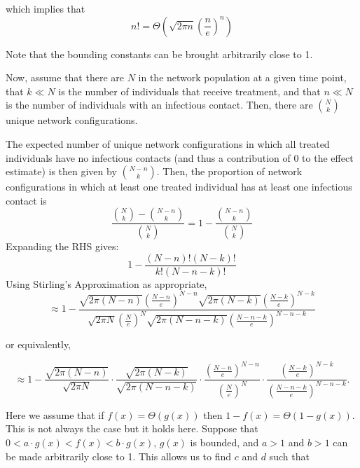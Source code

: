 \documentclass{article}
\theoremstyle{definition}
\begin{document}
\noindent which implies that
$$n!= \Theta\left(\sqrt{2\pi n}\left(\frac{n}{e}\right)^n \right)$$


\noindent Note that the bounding constants can be brought arbitrarily close to 1.

Now, assume that there are $N$ in the network population at a given time point, that $k\ll N$ is the number of individuals that receive treatment, and that $n\ll N$ is the number of individuals with an infectious contact. Then, there are $\binom{N}{k}$ unique network configurations.
 
The expected number of unique network configurations in which all treated individuals have no infectious contacts (and thus a contribution of 0 to the effect estimate) is then given by $\binom{N-n}{k}$. Then, the proportion of network configurations in which at least one treated individual has at least one infectious contact is 
\begin{equation} 
\frac{{\binom{N}{k}}-{\binom{N-n}{k}}}{{\binom{N}{k}}}=1-\frac{{\binom{N-n}{k}}}{{\binom{N}{k}}}  \nonumber
\end{equation}
Expanding the RHS gives:
\begin{equation}
1-\frac{\left(N-n\right)!\left(N-k\right)!}{k!\left(N-n-k\right)!} \nonumber
\end{equation}
Using Stirling's Approximation as appropriate,
\begin{equation}
\approx 1-\frac{\sqrt{2\pi\left(N-n\right)}\left(\frac{N-n}{e}\right)^{N-n}\sqrt{2\pi\left(N-k\right)}\left(\frac{N-k}{e}\right)^{N-k}}{\sqrt{2\pi N}\left(\frac{N}{e}\right)^{N}\sqrt{2\pi \left(N-n-k\right)}\left(\frac{N-n-k}{e}\right)^{N-n-k}}     \nonumber
\end{equation}

\noindent or equivalently, 

\begin{equation} \label{eq:19}
\approx 1-\frac{\sqrt{2\pi \left(N-n\right)}}{\sqrt{2\pi N}}\cdot\frac{\sqrt{2 \pi \left(N-k\right)}}{\sqrt{2 \pi \left(N-n-k\right)}}\cdot\frac{\left(\frac{N-n}{e}\right)^{N-n}}
{\left(\frac{N}{e}\right)^{N}}\cdot\frac{\left(\frac{N-k}{e}\right)^{N-k}}{\left(\frac{N-n-k}{e}\right)^{N-n-k}}.    
\end{equation}

\noindent Here we assume that if $f(x)=\Theta(g(x))$ then $1-f(x)=\Theta(1-g(x))$. This is not always the case but it holds here. Suppose that $0<a \cdot g(x)<f(x)<b \cdot g(x)$, $g(x)$ is bounded, and $a>1$ and $b>1$ can be made arbitrarily close to 1. This allows us to find $c$ and $d$ such that
\end{document}
